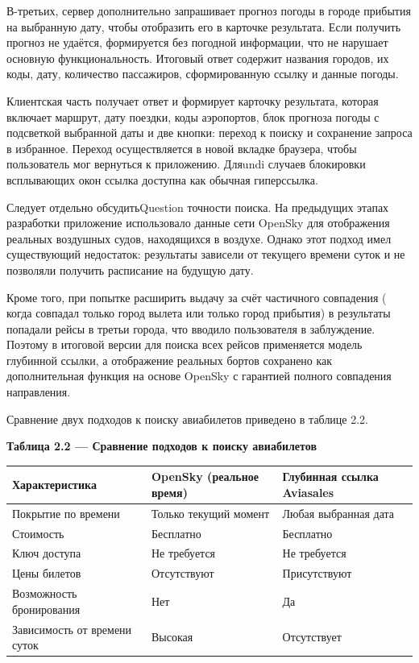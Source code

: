 \documentclass[14pt,a4paper,oneside]{extreport}
\begin{document}
В-третьих, сервер дополнительно запрашивает прогноз погоды в городе прибытия на выбранную дату, чтобы отобразить его в карточке результата. Если получить прогноз не удаётся, формируется без погодной информации, что не нарушает основную функциональность. Итоговый ответ содержит названия городов, их коды, дату, количество пассажиров, сформированную ссылку и данные погоды.

Клиентская часть получает ответ и формирует карточку результата, которая включает маршрут, дату поездки, коды аэропортов, блок прогноза погоды с подсветкой выбранной даты и две кнопки: переход к поиску и сохранение запроса в избранное. Переход осуществляется в новой вкладке браузера, чтобы пользователь мог вернуться к приложению. Дляundi случаев блокировки всплывающих окон ссылка доступна как обычная гиперссылка.

Следует отдельно обсудитьQuestion точности поиска. На предыдущих этапах разработки приложение использовало данные сети OpenSky для отображения реальных воздушных судов, находящихся в воздухе. Однако этот подход имел существующий недостаток: результаты зависели от текущего времени суток и не позволяли получить расписание на будущую дату.

Кроме того, при попытке расширить выдачу за счёт частичного совпадения ( когда совпадал только город вылета или только город прибытия) в результаты попадали рейсы в третьи города, что вводило пользователя в заблуждение. Поэтому в итоговой версии для поиска всех рейсов применяется модель глубинной ссылки, а отображение реальных бортов сохранено как дополнительная функция на основе OpenSky с гарантией полного совпадения направления.

Сравнение двух подходов к поиску авиабилетов приведено в таблице 2.2.

\begin{table}[htbp]\centering

\textbf{Таблица 2.2 — Сравнение подходов к поиску авиабилетов}\par\vspace{4pt}

\begin{center}
\small
\begin{tabularx}{\textwidth}{|X|X|X|}
\hline
Характеристика & OpenSky (реальное время) & Глубинная ссылка Aviasales \\
\hline
Покрытие по времени & Только текущий момент & Любая выбранная дата \\
\hline
Стоимость & Бесплатно & Бесплатно \\
\hline
Ключ доступа & Не требуется & Не требуется \\
\hline
Цены билетов & Отсутствуют & Присутствуют \\
\hline
Возможность бронирования & Нет & Да \\
\hline
Зависимость от времени суток & Высокая & Отсутствует \\
\hline
\end{tabularx}
\end{center}

\end{table}
\end{document}
